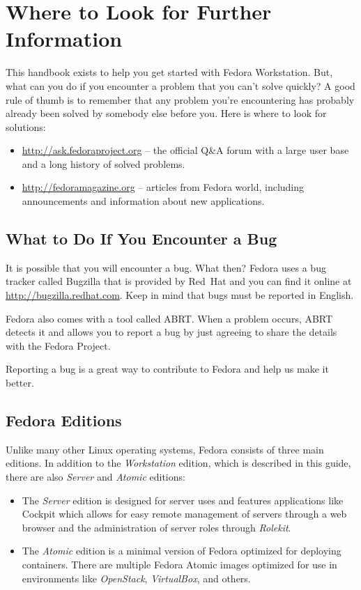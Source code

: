 \section*{Where to Look for Further Information}

This handbook exists to help you get started with Fedora Workstation. But, what can you do if you encounter a problem that you can't solve quickly? A good rule of thumb is to remember that any problem you're encountering has probably already been solved by somebody else before you. Here is where to look for solutions:
\begin{itemize}
\item\url{http://ask.fedoraproject.org} -- the official Q\&A forum with a large user base and a long history of solved problems.

\item\url{http://fedoramagazine.org} -- articles from Fedora world, including announcements and information about new applications.
\end{itemize}

\subsection*{What to Do If You Encounter a Bug}

It is possible that you will encounter a bug. What then? Fedora uses a bug tracker called Bugzilla that is provided by Red~Hat and you can find it online at \url{http://bugzilla.redhat.com}. Keep in mind that bugs must be reported in English.

Fedora also comes with a tool called ABRT. When a problem occurs, ABRT detects it and allows you to report a bug by just agreeing to share the details with the Fedora Project.

Reporting a bug is a great way to contribute to Fedora and help us make it better.

\subsection*{Fedora Editions}

Unlike many other Linux operating systems, Fedora consists of three main editions. In addition to the \emph{Workstation} edition, which is described in this guide, there are also \emph{Server} and \emph{Atomic} editions:
\begin{itemize}
\item The \emph{Server} edition is designed for server uses and features applications like Cockpit which allows for easy remote management of servers through a web browser and the administration of server roles through \emph{Rolekit}.

\item The \emph{Atomic} edition is a minimal version of Fedora optimized for deploying containers. There are multiple Fedora Atomic images optimized for use in environments like \emph{OpenStack}, \emph{VirtualBox}, and others.
\end{itemize}

